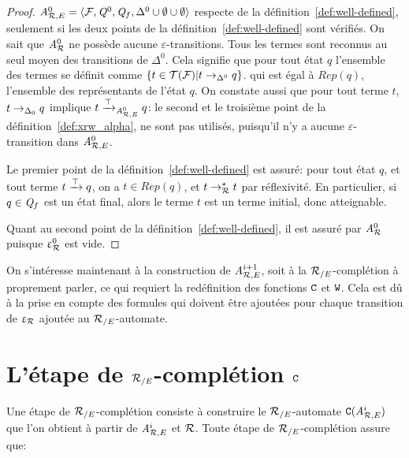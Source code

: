 \begin{proof}
  ${\mathit A}_{\mathcal R,E}^0 = \langle \mathcal{F}, \mathit Q^0, \mathit Q_f, \Delta^0 \cup \emptyset \cup \emptyset\rangle$
  respecte de la définition~\ref{def:well-defined}, seulement si les deux points
  de la définition~\ref{def:well-defined} sont vérifiés.
  \noindent
  On sait que ${\mathit A}_{\mathcal R}^0$ ne possède aucune $\varepsilon$-transitions.
  Tous les termes sont reconnus au seul moyen des transitions de $\Delta^0$.
  Cela signifie que pour tout état $q$ l'ensemble des termes se définit comme $\{ t \in \mathcal{T(F)} | t \rightarrow_{\Delta^0} q\}$.
  qui est égal à $Rep(q)$, l'ensemble des représentants de l'état $q$.
  On constate aussi que pour tout terme $t$, $t \rightarrow_{\Delta_0} q$ implique $t \xrightarrow{\top}_{{\mathit A}_{\mathcal R,E}^0} q$:
  le second et le troisième point de la définition~\ref{def:xrw_alpha}, ne sont pas utilisés, puisqu'il
  n'y a aucune $\varepsilon$-transition dans ${\mathit A}_{\mathcal R,E}^0$.
  
  Le premier point de la définition~\ref{def:well-defined} est assuré: 
  pour tout état $q$, et tout terme $t \xrightarrow{\top} q$, on a $t \in Rep(q)$, 
  et $t \rightarrow_\mathcal R^* t$ par réflexivité. En particulier, si $q \in \mathit Q_f$ est un 
  état final, alors le terme $t$ est un terme initial, donc atteignable.

  Quant au second point de la définition~\ref{def:well-defined}, il est assuré par ${\mathit A}_{\mathcal R}^0$ puisque $\upvarepsilon_{\mathcal R}^0$ est vide.
\end{proof}

On s'intéresse maintenant à la construction de ${\mathit A}_{\mathcal R,E}^{i+1}$, soit à la ${\mathcal R_{/E}}$-complétion à proprement parler, ce
qui requiert la redéfinition des fonctions $\mathtt{C}$ et $\mathtt{W}$. Cela est dû à la prise en compte des formules
qui doivent être ajoutées pour chaque transition de $\upvarepsilon_{\mathcal R}$ ajoutée au ${\mathcal R_{/E}}$-automate.


\section{L'étape de ${\mathcal R_{/E}}$-complétion $\mathtt{C}$}

Une étape de ${\mathcal R_{/E}}$-complétion consiste à construire le ${\mathcal R_{/E}}$-automate $\mathtt{C}({\mathit A}_{\mathcal R,E}^i)$ que l'on obtient à partir de ${\mathit A}_{\mathcal R,E}^i$ et $\mathcal R$.
Toute étape de ${\mathcal R_{/E}}$-complétion assure que:

